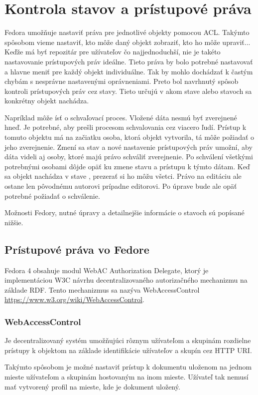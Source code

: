 \documentclass[thesis=M,slovak]{FITthesis}[2013/05/06]
\begin{document}
\section{Kontrola stavov a prístupové práva}
Fedora umožňuje nastaviť práva pre jednotlivé objekty pomocou ACL. Takýmto spôsobom vieme nastaviť, kto môže daný objekt zobraziť, kto ho môže upraviť... Keďže má byť repozitár pre užívateľov čo najjednoduchší, nie je takéto nastavovanie prístupových práv ideálne. Tieto práva by bolo potrebné nastavovať a hlavne meniť pre každý objekt individuálne. Tak by mohlo dochádzať k častým chybám s nesprávne nastavenými oprávneniami. Preto bol navrhnutý spôsob kontroli prístupových práv cez stavy. Tieto určujú v akom stave alebo stavoch sa konkrétny objekt nachádza.

Napríklad môže ísť o schvaľovací proces. Vložené dáta nesmú byť zverejnené hneď. Je potrebné, aby prešli procesom schvalovania cez viacero ľudí. Prístup k tomuto objektu má na začiatku osoba, ktorá objekt vytvorila, tá môže požiadať o jeho zverejnenie. Zmení sa stav a nové nastavenie prístupových práv umožní, aby dáta videli aj osoby, ktoré majú právo schváliť zverejnenie. Po schválení všetkými potrebnými osobami dôjde opäť ku zmene stavu a prístupu k týmto dátam. Keď sa objekt nachádza v stave , prezerať si ho môžu všetci. Právo na editáciu ale ostane len pôvodnému autorovi prípadne editorovi. Po úprave bude ale opäť potrebné požiadať o schválenie.

Možnosti Fedory, nutné úpravy a detailnejšie informácie o stavoch sú popísané nižšie.

\subsection{Prístupové práva vo Fedore}
Fedora 4 obsahuje modul WebAC Authorization Delegate, ktorý je implementáciou W3C návrhu decentralizovaného autorizačného mechanizmu na základe RDF. Tento mechanizmus sa nazýva WebAccessControl \url{https://www.w3.org/wiki/WebAccessControl}.

\subsubsection{WebAccessControl}
Je decentralizovaný systém umožňujúci rôznym užívateľom a skupinám rozdielne prístupy k objektom na základe identifikácie užívateľov a skupín cez HTTP URI. 

Takýmto spôsobom je možné nastaviť prístup k dokumentu uloženom na jednom mieste užívateľom a skupinám hostovaným na inom mieste. Užívateľ tak nemusí mať vytvorený profil na mieste, kde je dokument uložený.
\end{document}
